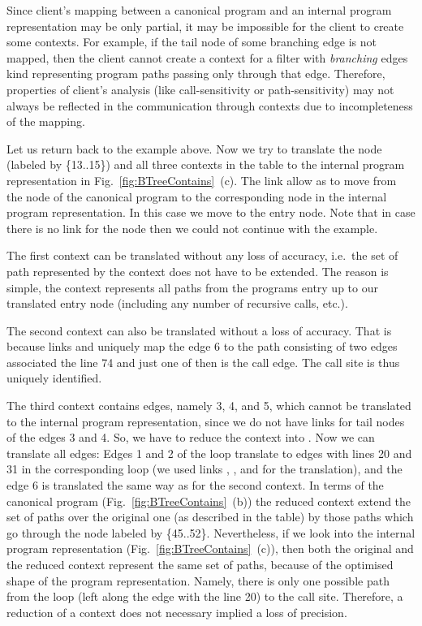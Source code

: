 \documentclass[envcountsame]{llncs}
\begin{document}
Since client's mapping between a canonical program and an internal program
representation may be only partial, it may be impossible for the client to
create some contexts. For example, if the tail node of some branching edge is
not mapped, then the client cannot create a context for a filter with
\textit{branching} edges kind representing program paths passing only through
that edge. Therefore, properties of client's analysis (like call-sensitivity or
path-sensitivity) may not always be  reflected in the communication through
contexts due to incompleteness of the mapping.

Let us return back to the example above. Now we try to translate the node
(labeled by \{13..15\}) and all three contexts in the table to the internal
program representation in Fig.~\ref{fig:BTreeContains}~(c). The link 
allow as to move from the node of the canonical program to the corresponding
node in the internal program representation. In this case we move to the entry
node. Note that in case there is no link for the node then we could not continue
with the example.

The first context  can be translated without any loss of accuracy,
i.e.~the set of path represented by the context does not have to be extended.
The reason is simple, the context represents all paths from the programs entry
up to our translated entry node (including any number of recursive calls, etc.).

The second context  can also be translated without a loss of
accuracy. That is because links  and  uniquely map the edge
6 to the path consisting of two edges associated the line 74 and just one of
then is the call edge. The call site is thus uniquely identified.

The third context  contains edges, namely 3, 4, and 5,
which cannot be translated to the internal program representation, since we do
not have links for tail nodes of the edges 3 and 4. So, we have to reduce the
context into . Now we can translate all edges: Edges 1 and 2 of
the loop translate to edges with lines 20 and 31 in the corresponding loop (we
used links , , and  for the translation), and the
edge 6 is translated the same way as for the second context. In terms of the
canonical program (Fig.~\ref{fig:BTreeContains}~(b)) the reduced context  extend the set of paths over the original one (as described in the
table) by those paths which go through the node labeled by \{45..52\}.
Nevertheless, if we look into the internal program representation
(Fig.~\ref{fig:BTreeContains}~(c)), then both the original and the reduced
context represent the same set of paths, because of the optimised shape of the
program representation. Namely, there is only one possible path from the loop
(left along the edge with the line 20) to the call site. Therefore, a reduction
of a context does not necessary implied a loss of precision.
\end{document}
